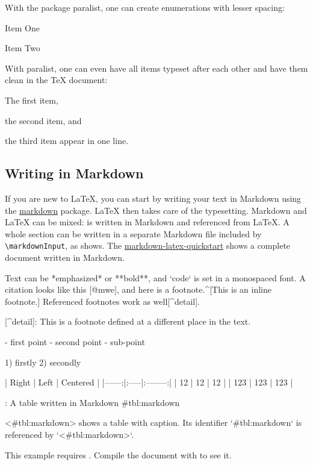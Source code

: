 With the package paralist, one can create enumerations with lesser spacing:

\begin{ltgexample}
\begin{compactenum}
  \item Item One
  \item Item Two
\end{compactenum}
\end{ltgexample}

With paralist, one can even have all items typeset after each other and have them clean in the TeX document:

\begin{ltgexample}
\begin{inparaenum}
  \item The first item,
  \item the second item, and
  \item the third item appear in one line.
\end{inparaenum}
\end{ltgexample}

\subsection{Writing in Markdown}\label{sec:markdown}

\ifluatex
  If you are new to \LaTeX{}, you can start by writing your text in Markdown using the \href{https://ctan.org/pkg/markdown}{markdown} package.
  \LaTeX{} then takes care of the typesetting.
  Markdown and \LaTeX{} can be mixed:
   is written in Markdown and referenced from \LaTeX{}.
  A whole section can be written in a separate Markdown file included by \verb|\markdownInput|, as  shows.
  The \href{https://github.com/latextemplates/markdown-latex-quickstart}{markdown-latex-quickstart} shows a complete document written in Markdown.

  \begin{ltgexample}
  \begin{markdown}
Text can be *emphasized* or **bold**, and `code` is set in a monospaced font.
A citation looks like this [@mwe], and here is a footnote.^[This is an inline footnote.]
Referenced footnotes work as well[^detail].

[^detail]: This is a footnote defined at a different place in the text.

- first point
- second point
  - sub-point

1) firstly
2) secondly

| Right | Left | Centered |
|------:|:-----|:--------:|
|    12 | 12   |    12    |
|   123 | 123  |   123    |

: A table written in Markdown {#tbl:markdown}

<#tbl:markdown> shows a table with caption.
Its identifier `{#tbl:markdown}` is referenced by `<#tbl:markdown>`.
\end{markdown}
  \end{ltgexample}
\else
  This example requires .
  Compile the document with  to see it.
\fi

